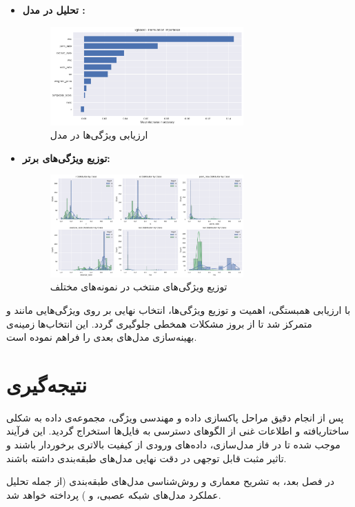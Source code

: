\begin{itemize}
    \item \textbf{تحلیل  در مدل :}
    \begin{figure}[ht]
        \centering
        \includegraphics[width=0.7\textwidth]{images/xgboost_permutation_importance.png}
        \caption{ارزیابی  ویژگی‌ها در مدل }
    \end{figure}

    \item \textbf{توزیع ویژگی‌های برتر:}
    \begin{figure}[ht]
        \centering
        \includegraphics[width=0.7\textwidth]{images/top_feature_distributions.png}
        \caption{توزیع ویژگی‌های منتخب در نمونه‌های مختلف}
    \end{figure}
\end{itemize}

با ارزیابی همبستگی، اهمیت و توزیع ویژگی‌ها، انتخاب نهایی بر روی ویژگی‌هایی مانند  و  متمرکز شد تا از بروز مشکلات همخطی جلوگیری گردد. این انتخاب‌ها زمینه‌ی بهینه‌سازی مدل‌های بعدی را فراهم نموده است.

\section{نتیجه‌گیری} پس از انجام دقیق مراحل پاکسازی داده و مهندسی ویژگی، مجموعه‌ی داده به شکلی ساختاریافته و اطلاعات غنی از الگوهای دسترسی به فایل‌ها استخراج گردید. این فرآیند موجب شده تا در فاز مدل‌سازی، داده‌های ورودی از کیفیت بالاتری برخوردار باشند و تاثیر مثبت قابل توجهی در دقت نهایی مدل‌های طبقه‌بندی داشته باشند.

در فصل بعد، به تشریح معماری و روش‌شناسی مدل‌های طبقه‌بندی (از جمله تحلیل عملکرد مدل‌های شبکه عصبی،  و ) پرداخته خواهد شد.
